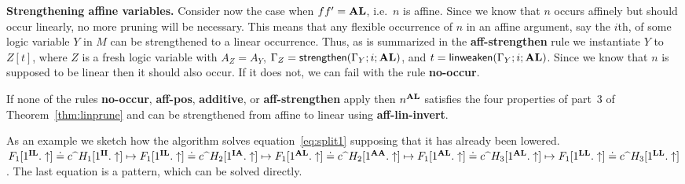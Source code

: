 \documentclass{eptcs}
\newcommand{\lhat}[1]{\widehat{\;#1\;}}
\newcommand\fI{\textup{$\mathbf{I}$}}
\newcommand\fA{\textup{$\mathbf{A}$}}
\newcommand\fL{\textup{$\mathbf{L}$}}
\theoremstyle{definition}
\begin{document}
\medskip \noindent\textbf{Strengthening affine variables.}
Consider now the case when $ff'=\fA\fL$, i.e.\ $n$ is affine.  Since we
know that $n$ occurs affinely but should occur linearly,
no more pruning will be necessary.  This means that any
flexible occurrence of $n$ in an affine argument,
say the $i$th, of some logic variable $Y$ in $M$ can be strengthened to
a linear occurrence.  Thus, as is summarized in the
\textbf{aff-strengthen} rule we instantiate $Y$ to $Z[t]$, where $Z$ is
a fresh logic variable with $A_Z=A_Y$,
$\Gamma_Z=\textsf{strengthen}(\Gamma_Y;i;\fA\fL)$, and
$t=\textsf{linweaken}(\Gamma_Y;i;\fA\fL)$.
Since we know that $n$ is supposed to be linear then it should also occur.
If it does not, we can fail with the rule \textbf{no-occur}.

If none of the rules \textbf{no-occur}, \textbf{aff-pos},
\textbf{additive}, or \textbf{aff-strengthen} apply then $n^{\fA\fL}$
satisfies the four properties of part~3 of Theorem~\ref{thm:linprune}
and can be strengthened from affine to linear using
\textbf{aff-lin-invert}.

\bigskip

As an example we sketch how the algorithm solves
equation~\eqref{eq:split1} supposing that it has already been lowered.
$F_1[1^{\fI\fL}.\uparrow]\doteq c\lhat{}H_1[1^{\fI\fI}.\uparrow]\mapsto
F_1[1^{\fI\fL}.\uparrow]\doteq c\lhat{}H_2[1^{\fI\fA}.\uparrow]\mapsto
F_1[1^{\fA\fL}.\uparrow]\doteq c\lhat{}H_2[1^{\fA\fA}.\uparrow]\mapsto
F_1[1^{\fA\fL}.\uparrow]\doteq c\lhat{}H_3[1^{\fA\fL}.\uparrow]\mapsto
F_1[1^{\fL\fL}.\uparrow]\doteq c\lhat{}H_3[1^{\fL\fL}.\uparrow]$.  The
last equation is a pattern, which can be solved directly.
\end{document}
